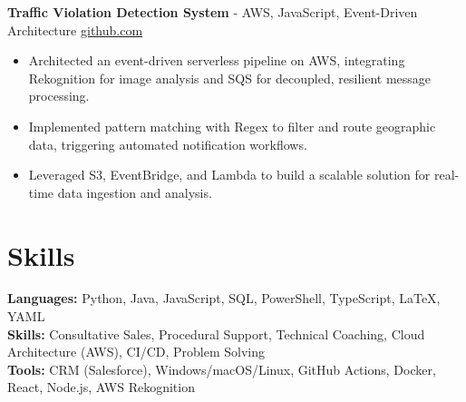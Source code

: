 \documentclass[11pt]{article}       %
\begin{document}
\textbf{Traffic Violation Detection System}{ - AWS, JavaScript, Event-Driven Architecture} \hfill \href{https://github.com/Monica20030707/AWS_rekonigition-N-read-database}{github.com} \\
\vspace{-9pt}
\begin{itemize}
  \item Architected an event-driven serverless pipeline on AWS, integrating Rekognition for image analysis and SQS for decoupled, resilient message processing.
  \item Implemented pattern matching with Regex to filter and route geographic data, triggering automated notification workflows.
  \item Leveraged S3, EventBridge, and Lambda to build a scalable solution for real-time data ingestion and analysis.
\end{itemize}

\vspace{-18.5pt}


\section*{Skills}
\textbf{Languages:} Python, Java, JavaScript, SQL, PowerShell, TypeScript, LaTeX, YAML\\
\textbf{Skills:} Consultative Sales, Procedural Support, Technical Coaching, Cloud Architecture (AWS), CI/CD, Problem Solving\\
\textbf{Tools:} CRM (Salesforce), Windows/macOS/Linux, GitHub Actions, Docker, React, Node.js, AWS Rekognition\\

\vspace{-6.5pt}
\end{document}
